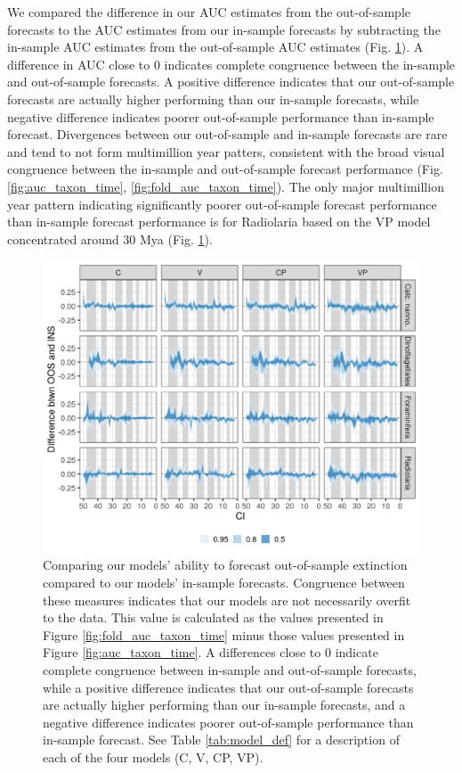 \documentclass[12pt,letterpaper]{article}
\begin{document}
\begin{refsection}
We compared the difference in our AUC estimates from the out-of-sample forecasts to the AUC estimates from our in-sample forecasts by subtracting the in-sample AUC estimates from the out-of-sample AUC estimates (Fig. \ref{fig:oos_ins_diff}). A difference in AUC close to 0 indicates complete congruence between the in-sample and out-of-sample forecasts. A positive difference indicates that our out-of-sample forecasts are actually higher performing than our in-sample forecasts, while negative difference indicates poorer out-of-sample performance than in-sample forecast. Divergences between our out-of-sample and in-sample forecasts are rare and tend to not form multimillion year patters, consistent with the broad visual congruence between the in-sample and out-of-sample forecast performance (Fig. \ref{fig:auc_taxon_time}, \ref{fig:fold_auc_taxon_time}). The only major multimillion year pattern indicating significantly poorer out-of-sample forecast performance than in-sample forecast performance is for Radiolaria based on the VP model concentrated around 30 Mya (Fig. \ref{fig:oos_ins_diff}).

\begin{figure}[ht]
 \centering
 \includegraphics[width=\textwidth,height=0.5\textheight,keepaspectratio=true]{../results/figure/auc_diff}
 \caption{Comparing our models' ability to forecast out-of-sample extinction compared to our models' in-sample forecasts. Congruence between these measures indicates that our models are not necessarily overfit to the data. This value is calculated as the values presented in Figure \ref{fig:fold_auc_taxon_time} minus those values presented in Figure \ref{fig:auc_taxon_time}. A differences close to 0 indicate complete congruence between in-sample and out-of-sample forecasts, while a positive difference indicates that our out-of-sample forecasts are actually higher performing than our in-sample forecasts, and a negative difference indicates poorer out-of-sample performance than in-sample forecast. See Table \ref{tab:model_def} for a description of each of the four models (C, V, CP, VP).}
 \label{fig:oos_ins_diff}
\end{figure}





\end{refsection}
\end{document}
